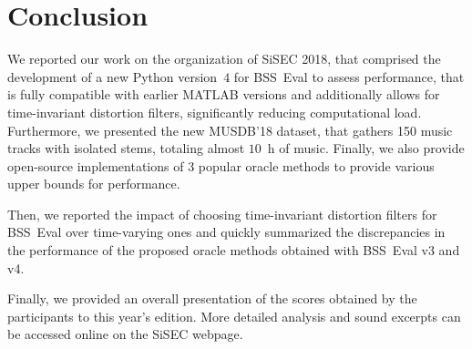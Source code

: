 \documentclass{llncs}
\begin{document}
\section{Conclusion}
\label{sec:concl}
\vspace{-2mm}
We reported our work on the organization of SiSEC 2018, that comprised the development of a new Python version~$4$ for BSS~Eval to assess performance, that is fully compatible with earlier MATLAB versions and additionally allows for time-invariant distortion filters, significantly reducing computational load. Furthermore, we presented the new MUSDB'18 dataset, that gathers 150 music tracks with isolated stems, totaling almost $10$~h of music. Finally, we also provide open-source implementations of $3$ popular oracle methods to provide various upper bounds for performance.

Then, we reported the impact of choosing time-invariant distortion filters for BSS~Eval over time-varying ones and quickly summarized the discrepancies in the performance of the proposed oracle methods obtained with BSS~Eval v3 and v4.

Finally, we provided an overall presentation of the scores obtained by the participants to this year's edition. More detailed analysis and sound excerpts can be accessed online on the SiSEC webpage.
\footnotesize


\end{document}
